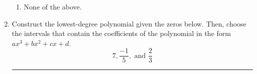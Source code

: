 \documentclass[14pt]{extbook}
\newcommand{\litem}[1]{\item#1\hspace*{-1cm}\rule{\textwidth}{0.4pt}}
\begin{document}
\begin{enumerate}
{\begin{enumerate}[label=\Alph*.]
\item None of the above.
\end{enumerate} }
\litem{
Construct the lowest-degree polynomial given the zeros below. Then, choose the intervals that contain the coefficients of the polynomial in the form $ax^3+bx^2+cx+d$.\[ 7, \frac{-1}{5}, \text{ and } \frac{2}{3} \]\begin{enumerate}[label=\Alph*.]

\end{enumerate}}
\end{enumerate}
\end{document}
